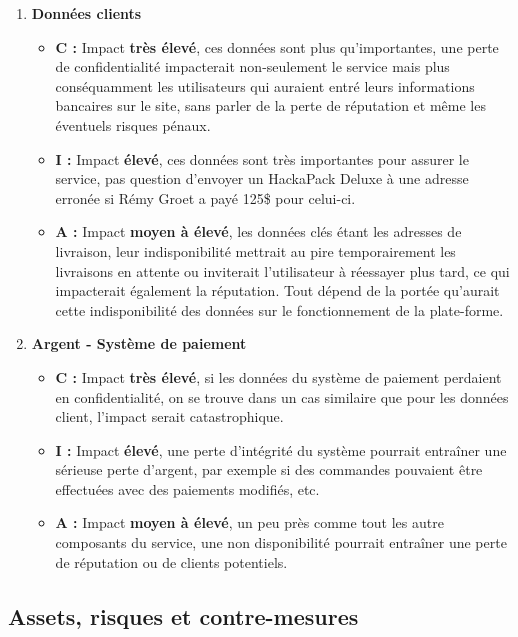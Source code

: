 \documentclass[a4paper,10pt,final,fleqn]{article}
\begin{document}
\begin{enumerate}
				\item \textbf{Données clients}

					\begin{itemize}
						\item \textbf{C : } Impact \textbf{très élevé}, ces données sont plus qu'importantes, une perte de confidentialité impacterait non-seulement le service mais plus conséquamment les utilisateurs qui auraient entré leurs informations bancaires sur le site, sans parler de la perte de réputation et même les éventuels risques pénaux.
						\item \textbf{I : } Impact \textbf{élevé}, ces données sont très importantes pour assurer le service, pas question d'envoyer un HackaPack Deluxe à une adresse erronée si Rémy Groet a payé 125\$ pour celui-ci.
						\item \textbf{A : } Impact \textbf{moyen à élevé}, les données clés étant les adresses de livraison, leur indisponibilité mettrait au pire temporairement les livraisons en attente ou inviterait l'utilisateur à réessayer plus tard, ce qui impacterait également la réputation. Tout dépend de la portée qu'aurait cette indisponibilité des données sur le fonctionnement de la plate-forme.
					\end{itemize}


				\item \textbf{Argent - Système de paiement}

					\begin{itemize}
						\item \textbf{C : } Impact \textbf{très élevé}, si les données du système de paiement perdaient en confidentialité, on se trouve dans un cas similaire que pour les données client, l'impact serait catastrophique.
						\item \textbf{I : } Impact \textbf{élevé}, une perte d'intégrité du système pourrait entraîner une sérieuse perte d'argent, par exemple si des commandes pouvaient être effectuées avec des paiements modifiés, etc.
						\item \textbf{A : } Impact \textbf{moyen à élevé}, un peu près comme tout les autre composants du service, une non disponibilité pourrait entraîner une perte de réputation ou de clients potentiels.
					\end{itemize}

			\end{enumerate}

		\subsection{Assets, risques et contre-mesures}
\end{document}
